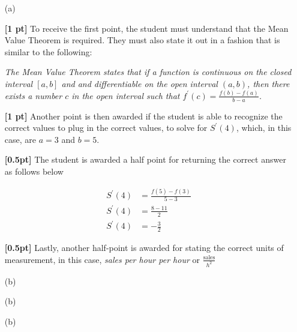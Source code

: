 \documentclass[11pt]{article}
\begin{document}
    \begin{enumerate}

		\item[(a)]
		
            \textbf{[1 pt]} To receive the first point, the student must understand that the Mean Value Theorem
            is required. They must also state it out in a fashion that is similar to the following: 

            \begin{center}
                \textit{The Mean Value Theorem states that if a function is continuous on the closed interval $[a, b]$ 
                and and differentiable on the open interval $(a, b)$, then there exists a number $c$ in the 
                open interval such that $f^{\prime}(c) = \frac{f(b) - f(a)}{b - a}$.}
            \end{center}

            \textbf{[1 pt]} Another point is then awarded if the student is able to recognize the correct values to plug in the correct values,
            to solve for $S^{\prime}(4)$, which, in this case, are $a = 3$ and $b = 5$.

            \textbf{[0.5pt]} The student is awarded a half point for returning the correct answer as follows below

            \[
                \begin{aligned}
                    S^{\prime}(4) &= \frac{f(5) - f(3)}{5 - 3} \\
                    S^{\prime}(4) &= \frac{8 - 11}{2} \\
                    S^{\prime}(4) &= -\frac{3}{2}
                \end{aligned}    
            \]

            \textbf{[0.5pt]} Lastly, another half-point is awarded for stating the correct units of measurement, 
            in this case, \textit{sales per hour per hour} or $\frac{\text{sales}}{h^2}$
		
		\item[(b)]
		
        \item[(b)]
        
        \item[(b)]
		
    \end{enumerate}
	
\end{document}
